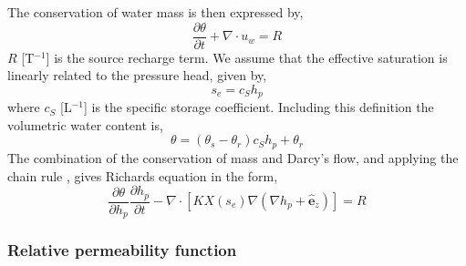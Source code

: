 \documentclass[hess, manuscript]{copernicus}
\begin{document}
The conservation of water mass is then expressed by,
\begin{equation}
\frac{\partial \theta}{\partial t} + \nabla \cdot u_{w} = R
\end{equation}
$R$ [T$^{-1}$] is the source recharge term. We assume that the effective saturation is linearly related to the pressure head, given by,
\begin{equation}
s_{e} = c_{S}h_{p}
\end{equation}
where $c_{S}$ [L$^{-1}$] is the specific storage coefficient. Including this definition the volumetric water content is,
\begin{equation}
\theta = \left(\theta_{s} - \theta_{r}\right)c_{S}h_{p} + \theta_{r}
\label{eq:theta}
\end{equation}
The combination of the conservation of mass and Darcy's flow, and applying the chain rule \citep[e.g.][]{farthing-2017}, gives Richards equation in the form, 
\begin{equation}
\frac{\partial \theta}{\partial h_{p}}  \frac{\partial h_{p}}{\partial t} - \nabla\cdot\left[KX(s_{e}) \nabla\left(\nabla h_{p} + \hat{\mathbf{e}}_{z}\right)\right] = R
\label{eq:richards}
\end{equation} 

\subsubsection{Relative permeability function}
\end{document}
